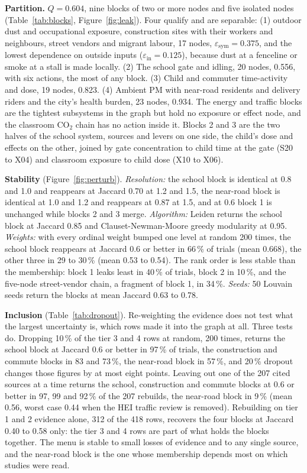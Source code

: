 \documentclass[10pt,a4paper]{article}
\newcommand{\eps}{\varepsilon}
\begin{document}
\textbf{Partition.} \(Q=0.604\), nine blocks of two or more nodes and five isolated nodes (Table~\ref{tab:blocks}, Figure~\ref{fig:leak}). Four qualify and are separable: (1) outdoor dust and occupational exposure, construction sites with their workers and neighbours, street vendors and migrant labour, 17 nodes, \(\eps_{\mathrm{sym}}=0.375\), and the lowest dependence on outside inputs (\(\eps_{\mathrm{in}}=0.125\)), because dust at a fenceline or smoke at a stall is made locally. (2) The school gate and idling, 20 nodes, \num{0.556}, with six actions, the most of any block. (3) Child and commuter time-activity and dose, 19 nodes, \num{0.823}. (4) Ambient PM with near-road residents and delivery riders and the city's health burden, 23 nodes, \num{0.934}. The energy and traffic blocks are the tightest subsystems in the graph but hold no exposure or effect node, and the classroom CO\(_2\) chain has no action inside it. Blocks 2 and 3 are the two halves of the school system, sources and levers on one side, the child's dose and effects on the other, joined by gate concentration to child time at the gate (S20 to X04) and classroom exposure to child dose (X10 to X06).

\textbf{Stability} (Figure~\ref{fig:perturb}). \emph{Resolution:} the school block is identical at 0.8 and 1.0 and reappears at Jaccard 0.70 \citep{Jaccard1912} at 1.2 and 1.5, the near-road block is identical at 1.0 and 1.2 and reappears at 0.87 at 1.5, and at 0.6 block 1 is unchanged while blocks 2 and 3 merge. \emph{Algorithm:} Leiden \citep{Traag2019} returns the school block at Jaccard 0.85 and Clauset-Newman-Moore greedy modularity \citep{Clauset2004} at 0.95. \emph{Weights:} with every ordinal weight bumped one level at random 200 times, the school block reappears at Jaccard 0.6 or better in 66\,\% of trials (mean 0.668), the other three in 29 to 30\,\% (mean 0.53 to 0.54). The rank order is less stable than the membership: block 1 leaks least in 40\,\% of trials, block 2 in 10\,\%, and the five-node street-vendor chain, a fragment of block 1, in 34\,\%. \emph{Seeds:} 50 Louvain seeds return the blocks at mean Jaccard 0.63 to 0.78.

\textbf{Inclusion} (Table~\ref{tab:dropout}). Re-weighting the evidence does not test what the largest uncertainty is, which rows made it into the graph at all. Three tests do. Dropping 10\,\% of the tier 3 and 4 rows at random, 200 times, returns the school block at Jaccard 0.6 or better in 97\,\% of trials, the construction and commute blocks in 83 and 73\,\%, the near-road block in 57\,\%, and 20\,\% dropout changes those figures by at most eight points. Leaving out one of the 207 cited sources at a time returns the school, construction and commute blocks at 0.6 or better in 97, 99 and 92\,\% of the 207 rebuilds, the near-road block in 9\,\% (mean 0.56, worst case 0.44 when the HEI traffic review is removed). Rebuilding on tier 1 and 2 evidence alone, 312 of the 418 rows, recovers the four blocks at Jaccard 0.40 to 0.58 only: the tier 3 and 4 rows are part of what holds the blocks together. The menu is stable to small losses of evidence and to any single source, and the near-road block is the one whose membership depends most on which studies were read.
\end{document}
